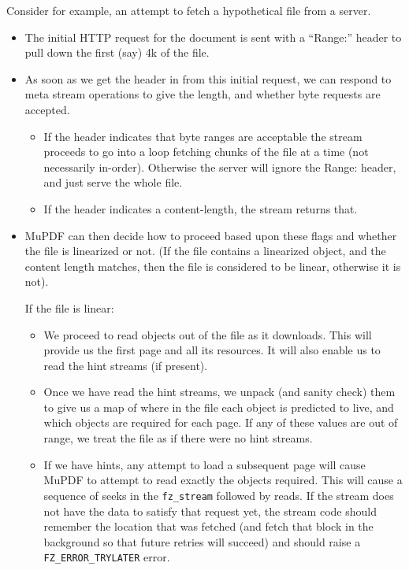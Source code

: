 \documentclass[oneside]{book}
\begin{document}
Consider for example, an attempt to fetch a hypothetical file from a server.

\begin{itemize}

\item
The initial HTTP request for the document is sent with a ``Range:'' header to pull down the first (say) 4k of the file.

\item
As soon as we get the header in from this initial request, we can respond to meta stream operations to give the length, and whether byte requests are accepted.

\begin{itemize}
\item
If the header indicates that byte ranges are acceptable the stream proceeds to go into a loop fetching chunks of the file at a time (not necessarily in-order). Otherwise the server will ignore the Range: header, and just serve the whole file.

\item
If the header indicates a content-length, the stream returns that.
\end{itemize}

\item
MuPDF can then decide how to proceed based upon these flags and whether the file is linearized or not. (If the file contains a linearized object, and the content length matches, then the file is considered to be linear, otherwise it is not).

If the file is linear:

\begin{itemize}
\item
We proceed to read objects out of the file as it downloads. This will provide us the first page and all its resources. It will also enable us to read the hint streams (if present).

\item
Once we have read the hint streams, we unpack (and sanity check) them to give us a map of where in the file each object is predicted to live, and which objects are required for each page. If any of these values are out of range, we treat the file as if there were no hint streams.

\item
If we have hints, any attempt to load a subsequent page will cause MuPDF to attempt to read exactly the objects required. This will cause a sequence of seeks in the \texttt{fz\_stream} followed by reads. If the stream does not have the data to satisfy that request yet, the stream code should remember the location that was fetched (and fetch that block in the background so that future retries will succeed) and should raise a \texttt{FZ\_ERROR\_TRYLATER} error.


\end{itemize}
\end{itemize}
\end{document}
